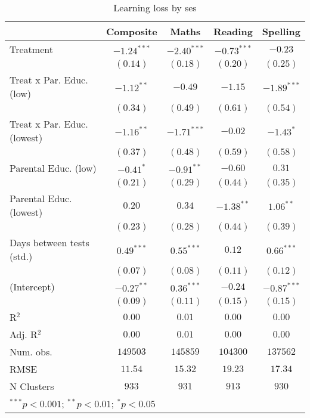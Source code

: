 
\begin{table}
\begin{center}
\begin{tabular}{l c c c c}
\hline
 & Composite & Maths & Reading & Spelling \\
\hline
Treatment                   & $-1.24^{***}$ & $-2.40^{***}$ & $-0.73^{***}$ & $-0.23$       \\
                            & $(0.14)$      & $(0.18)$      & $(0.20)$      & $(0.25)$      \\
Treat x Par. Educ. (low)    & $-1.12^{**}$  & $-0.49$       & $-1.15$       & $-1.89^{***}$ \\
                            & $(0.34)$      & $(0.49)$      & $(0.61)$      & $(0.54)$      \\
Treat x Par. Educ. (lowest) & $-1.16^{**}$  & $-1.71^{***}$ & $-0.02$       & $-1.43^{*}$   \\
                            & $(0.37)$      & $(0.48)$      & $(0.59)$      & $(0.58)$      \\
Parental Educ. (low)        & $-0.41^{*}$   & $-0.91^{**}$  & $-0.60$       & $0.31$        \\
                            & $(0.21)$      & $(0.29)$      & $(0.44)$      & $(0.35)$      \\
Parental Educ. (lowest)     & $0.20$        & $0.34$        & $-1.38^{**}$  & $1.06^{**}$   \\
                            & $(0.23)$      & $(0.28)$      & $(0.44)$      & $(0.39)$      \\
Days between tests (std.)   & $0.49^{***}$  & $0.55^{***}$  & $0.12$        & $0.66^{***}$  \\
                            & $(0.07)$      & $(0.08)$      & $(0.11)$      & $(0.12)$      \\
(Intercept)                 & $-0.27^{**}$  & $0.36^{***}$  & $-0.24$       & $-0.87^{***}$ \\
                            & $(0.09)$      & $(0.11)$      & $(0.15)$      & $(0.15)$      \\
\hline
R$^2$                       & $0.00$        & $0.01$        & $0.00$        & $0.00$        \\
Adj. R$^2$                  & $0.00$        & $0.01$        & $0.00$        & $0.00$        \\
Num. obs.                   & $149503$      & $145859$      & $104300$      & $137562$      \\
RMSE                        & $11.54$       & $15.32$       & $19.23$       & $17.34$       \\
N Clusters                  & $933$         & $931$         & $913$         & $930$         \\
\hline
\multicolumn{5}{l}{\scriptsize{$^{***}p<0.001$; $^{**}p<0.01$; $^{*}p<0.05$}}
\end{tabular}
\caption{Learning loss by ses}
\label{tableses}
\end{center}
\end{table}
